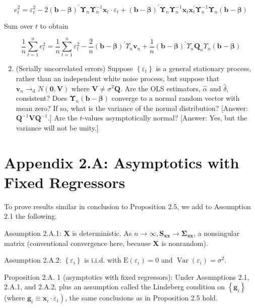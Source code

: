 \documentclass[10pt]{article}
\begin{document}
$$
e_{t}^{2}=\varepsilon_{t}^{2}-2(\mathbf{b}-\boldsymbol{\beta})^{\prime} \boldsymbol{\Upsilon}_{n} \boldsymbol{\Upsilon}_{n}^{-1} \mathbf{x}_{t} \cdot \varepsilon_{t}+(\mathbf{b}-\boldsymbol{\beta})^{\prime} \boldsymbol{\Upsilon}_{n} \boldsymbol{\Upsilon}_{n}^{-1} \mathbf{x}_{t} \mathbf{x}_{t}^{\prime} \boldsymbol{\Upsilon}_{n}^{-1} \boldsymbol{\Upsilon}_{n}(\mathbf{b}-\boldsymbol{\beta})
$$

Sum over $t$ to obtain

$$
\frac{1}{n} \sum_{t=1}^{n} e_{t}^{2}=\frac{1}{n} \sum_{t=1}^{n} \varepsilon_{t}^{2}-\frac{2}{n}(\mathbf{b}-\boldsymbol{\beta})^{\prime} \Upsilon_{n} \mathbf{v}_{n}+\frac{1}{n}(\mathbf{b}-\boldsymbol{\beta})^{\prime} \Upsilon_{n} \mathbf{Q}_{n} \Upsilon_{n}(\mathbf{b}-\boldsymbol{\beta})
$$

\begin{enumerate}
  \setcounter{enumi}{1}
  \item (Serially uncorrelated errors) Suppose $\left\{\varepsilon_{t}\right\}$ is a general stationary process, rather than an independent white noise process, but suppose that $\mathbf{v}_{n} \rightarrow_{\mathrm{d}} N(\mathbf{0}, \mathbf{V})$ where $\mathbf{V} \neq \sigma^{2} \mathbf{Q}$. Are the OLS estimators, $\hat{\alpha}$ and $\hat{\delta}$, consistent? Does $\boldsymbol{\Upsilon}_{n}(\mathbf{b}- \boldsymbol{\beta})$ converge to a normal random vector with mean zero? If so, what is the variance of the normal distribution? [Answer: $\mathbf{Q}^{-1} \mathbf{V} \mathbf{Q}^{-1}$.] Are the $t$-values asymptotically normal? [Answer: Yes, but the variance will not be unity.]
\end{enumerate}

\section*{Appendix 2.A: Asymptotics with Fixed Regressors}
To prove results similar in conclusion to Proposition 2.5, we add to Assumption 2.1 the following.

Assumption 2.A.1: $\mathbf{X}$ is deterministic. As $n \rightarrow \infty, \mathbf{S}_{\mathbf{x x}} \rightarrow \boldsymbol{\Sigma}_{\mathbf{x x}}$, a nonsingular matrix (conventional convergence here, because $\mathbf{X}$ is nonrandom).

Assumption 2.A.2: $\left\{\varepsilon_{i}\right\}$ is i.i.d. with $\mathrm{E}\left(\varepsilon_{i}\right)=0$ and $\operatorname{Var}\left(\varepsilon_{i}\right)=\sigma^{2}$.

Proposition 2.A. 1 (asymptotics with fixed regressors): Under Assumptions 2.1, 2.A.1, and 2.A.2, plus an assumption called the Lindeberg condition on $\left\{\mathbf{g}_{i}\right\}$ (where $\left.\mathbf{g}_{i} \equiv \mathbf{x}_{i} \cdot \varepsilon_{i}\right)$, the same conclusions as in Proposition 2.5 hold.
\end{document}

